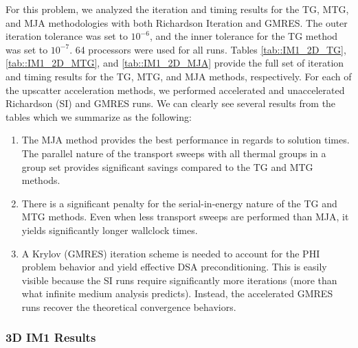 For this problem, we analyzed the iteration and timing results for the TG, MTG, and MJA methodologies with both Richardson Iteration and GMRES. The outer iteration tolerance was set to $10^{-6}$, and the inner tolerance for the TG method was set to $10^{-7}$. 64 processors were used for all runs. Tables \ref{tab::IM1_2D_TG}, \ref{tab::IM1_2D_MTG}, and \ref{tab::IM1_2D_MJA} provide the full set of iteration and timing results for the TG, MTG, and MJA methods, respectively. For each of the upscatter acceleration methods, we performed accelerated and unaccelerated Richardson (SI) and GMRES runs. We can clearly see several results from the tables which we summarize as the following:

\begin{enumerate}
\item The MJA method provides the best performance in regards to solution times. The parallel nature of the transport sweeps with all thermal groups in a group set provides significant savings compared to the TG and MTG methods.
\item There is a significant penalty for the serial-in-energy nature of the TG and MTG methods. Even when less transport sweeps are performed than MJA, it yields significantly longer wallclock times.
\item A Krylov (GMRES) iteration scheme is needed to account for the PHI problem behavior and yield effective DSA preconditioning. This is easily visible because the SI runs require significantly more iterations (more than what infinite medium analysis predicts). Instead, the accelerated GMRES runs recover the theoretical convergence behaviors.
\end{enumerate}


\subsubsection{3D IM1 Results}
\label{sec::DSA_Results_IM1_3D}

